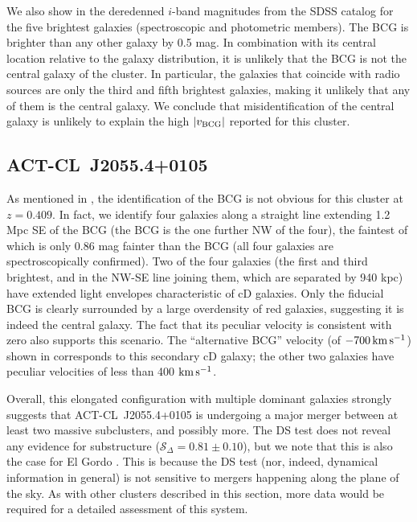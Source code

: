 We also show in  the deredenned $i$-band magnitudes from the SDSS catalog for the five brightest galaxies (spectroscopic and photometric members). The BCG is brighter than any other galaxy by 0.5 mag. In combination with its central location relative to the galaxy distribution, it is unlikely that the BCG is not the central galaxy of the cluster. In particular, the galaxies that coincide with radio sources are only the third and fifth brightest galaxies, making it unlikely that any of them is the central galaxy. We conclude that misidentification of the central galaxy is unlikely to explain the high $\lvert v_{\rm BCG}\rvert$ reported for this cluster.


\subsection{ACT-CL~J2055.4+0105}
\label{s:J2055}

As mentioned in , the identification of the BCG is not obvious for this cluster at $z=0.409$. In fact, we identify four galaxies along a straight line extending 1.2 Mpc SE of the BCG (the BCG is the one further NW of the four), the faintest of which is only 0.86 mag fainter than the BCG (all four galaxies are spectroscopically confirmed). Two of the four galaxies (the first and third brightest, and in the NW-SE line joining them, which are separated by 940 kpc) have extended light envelopes characteristic of cD galaxies. Only the fiducial BCG is clearly surrounded by a large overdensity of red galaxies, suggesting it is indeed the central galaxy. The fact that its peculiar velocity is consistent with zero also supports this scenario. The ``alternative BCG'' velocity (of $-700\,\mathrm{km\,s^{-1}}$) shown in  corresponds to this secondary cD galaxy; the other two galaxies have peculiar velocities of less than 400 $\mathrm{km\,s^{-1}}$.

Overall, this elongated configuration with multiple dominant galaxies strongly suggests that ACT-CL~J2055.4+0105 is undergoing a major merger between at least two massive subclusters, and possibly more. The DS test does not reveal any evidence for substructure ($\mathcal{S}_\Delta=0.81\pm0.10$), but we note that this is also the case for El Gordo \citep{sifon13}. This is because the DS test (nor, indeed, dynamical information in general) is not sensitive to mergers happening along the plane of the sky. As with other clusters described in this section, more data would be required for a detailed assessment of this system.

